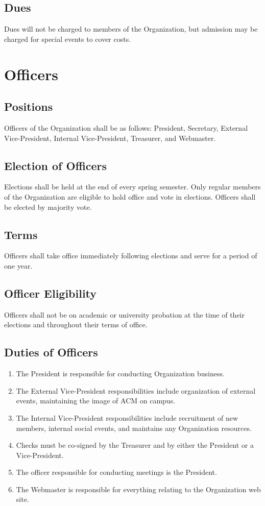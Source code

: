 \documentclass{article}
\begin{document}
\subsection{Dues}
Dues will not be charged to members of the Organization, but admission may be charged for special events to cover costs.

\section{Officers}
\subsection{Positions}
Officers of the Organization shall be as follows: President, Secretary, External Vice-President, Internal Vice-President, Treasurer, and Webmaster.
\subsection{Election of Officers}
Elections shall be held at the end of every spring semester. Only regular members of the Organization are eligible to hold office and vote in elections. Officers shall be elected by majority vote.
\subsection{Terms}
Officers shall take office immediately following elections and serve for a period of one year.
\subsection{Officer Eligibility}
Officers shall not be on academic or university probation at the time of their elections and throughout their terms of office.
\subsection{Duties of Officers}
\begin{enumerate}[label=(\Alph*)]
\item The President is responsible for conducting Organization business.
\item The External Vice-President responsibilities include organization of external events, maintaining the image of ACM on campus.
\item The Internal Vice-President responsibilities include recruitment of new members, internal social events, and maintains any Organization resources.
\item Checks must be co-signed by the Treasurer and by either the President or a Vice-President.
\item The officer responsible for conducting meetings is the President.
\item The Webmaster is responsible for everything relating to the Organization web site.
\end{enumerate}
\end{document}
